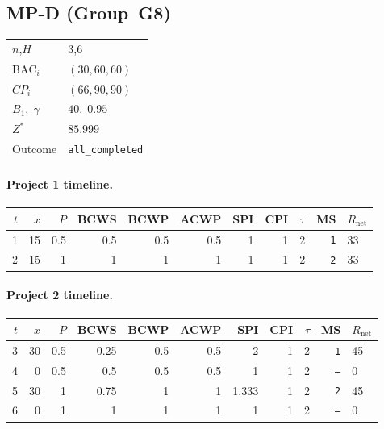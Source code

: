 \documentclass[12pt, a4paper]{article}
\newcommand{\BAC}{\mathrm{BAC}}
\begin{document}
\newpage

\subsection*{MP-D  (Group~G8)}
\begin{center}
\begin{tabular}{ll}
\toprule
$n$,\;$H$ & $3$,\;$6$ \\
$\BAC_i$ & $(30, 60, 60)$ \\
$CP_i$   & $(66, 90, 90)$ \\
$B_1,\;\gamma$ & $40,\;0.95$ \\
$Z^*$ & $85.999$ \\
Outcome & \texttt{all_completed} \\
\bottomrule
\end{tabular}
\end{center}

\paragraph{Project 1 timeline.}
\begin{center}
\begin{tabular}{rrrrrrrrrrl}
\toprule
$t$ & $x$ & $P$ & BCWS & BCWP & ACWP & SPI & CPI & $\tau$ & MS & $R_{\mathrm{net}}$\\
\midrule
1 & 15 & 0.5 & 0.5 & 0.5 & 0.5 & 1 & 1 & 2 & \texttt{1} & 33 \\
2 & 15 & 1 & 1 & 1 & 1 & 1 & 1 & 2 & \texttt{2} & 33 \\
\bottomrule
\end{tabular}
\end{center}
\paragraph{Project 2 timeline.}
\begin{center}
\begin{tabular}{rrrrrrrrrrl}
\toprule
$t$ & $x$ & $P$ & BCWS & BCWP & ACWP & SPI & CPI & $\tau$ & MS & $R_{\mathrm{net}}$\\
\midrule
3 & 30 & 0.5 & 0.25 & 0.5 & 0.5 & 2 & 1 & 2 & \texttt{1} & 45 \\
4 & 0 & 0.5 & 0.5 & 0.5 & 0.5 & 1 & 1 & 2 & \texttt{---} & 0 \\
5 & 30 & 1 & 0.75 & 1 & 1 & 1.333 & 1 & 2 & \texttt{2} & 45 \\
6 & 0 & 1 & 1 & 1 & 1 & 1 & 1 & 2 & \texttt{---} & 0 \\
\bottomrule
\end{tabular}
\end{center}
\end{document}
